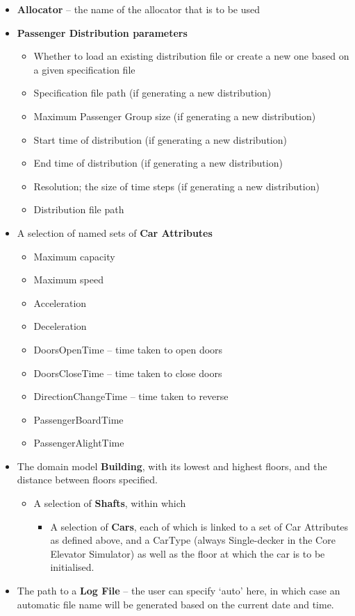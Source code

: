 \documentclass{UoYCSproject}
\begin{document}
\begin{itemize}
	\item \textbf{Allocator} -- the name of the allocator that is to be used
	\item \textbf{Passenger Distribution parameters}
	\begin{itemize}
		\item Whether to load an existing distribution file or create a new one based on a given specification file
		\item Specification file path (if generating a new distribution)
		\item Maximum Passenger Group size (if generating a new distribution)
		\item Start time of distribution (if generating a new distribution)
		\item End time of distribution (if generating a new distribution)
		\item Resolution; the size of time steps (if generating a new distribution)
		\item Distribution file path
	\end{itemize}
	\item A selection of named sets of \textbf{Car Attributes}
	\begin{itemize}
		\item Maximum capacity
		\item Maximum speed
		\item Acceleration
		\item Deceleration
		\item DoorsOpenTime -- time taken to open doors
		\item DoorsCloseTime -- time taken to close doors
		\item DirectionChangeTime -- time taken to reverse
		\item PassengerBoardTime
		\item PassengerAlightTime
	\end{itemize}
	\item The domain model \textbf{Building}, with its lowest and highest floors, and the distance between floors specified.
	\begin{itemize}
		\item A selection of \textbf{Shafts}, within which
		\begin{itemize}
			\item A selection of \textbf{Cars}, each of which is linked to a set of Car Attributes as defined above, and a CarType (always Single-decker in the Core Elevator Simulator) as well as the floor at which the car is to be initialised.
		\end{itemize}
	\end{itemize}
	\item The path to a \textbf{Log File} -- the user can specify `auto' here, in which case an automatic file name will be generated based on the current date and time.
\end{itemize}
\end{document}
